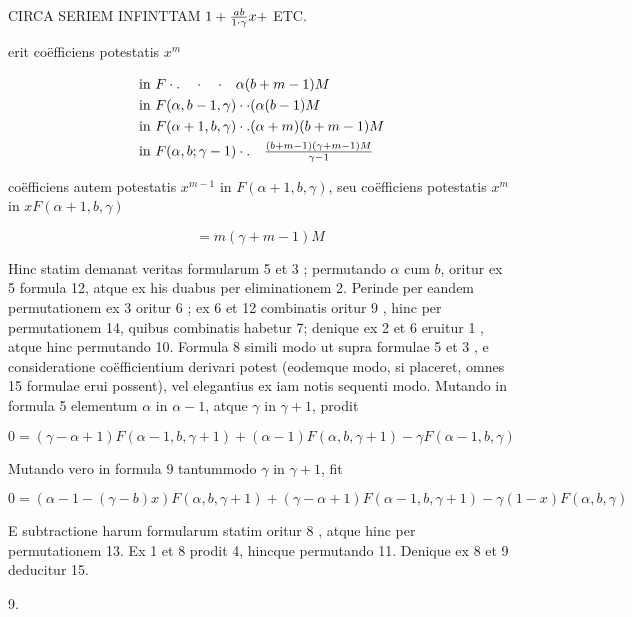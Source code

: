 \documentclass[twoside,12pt, showframe]{memoir}
\let\oldfrac\frac
\def\frac#1#2{\mathchoice{\tfrac{#1}{#2}}{\oldfrac{#1}{#2}}{\genfrac{}{}{}{2}{#1}{#2\mathstrut}}{\genfrac{}{}{}{3}{#1}{#2\mathstrut}}}
\begin{document}
CIRCA SERIEM INFINTTAM \(1+\frac{a b}{1 \cdot \gamma} x+\) ETC.

erit coëfficiens potestatis \(x^{m}\)

\[
\begin{aligned}
& \text { in } F \cdot . \quad \cdot \quad \cdot \quad \alpha(b+m-1) M \\
& \text { in } F(\alpha, b-1, \gamma) \cdot \cdot(\alpha(b-1) M \\
& \text { in } F(\alpha+1, b, \gamma) \cdot .(\alpha+m)(b+m-1) M \\
& \text { in } F(\alpha, b ; \gamma-1) \cdot . \quad \frac{(b+m-1)(\gamma+m-1) M}{\gamma-1}
\end{aligned}
\]

coëfficiens autem potestatis \(x^{m-1}\) in \(F(\alpha+1, b, \gamma)\), seu coëfficiens potestatis \(x^{m}\) in \(x F(\alpha+1, b, \gamma)\)

\[
=m(\gamma+m-1) M
\]

Hinc statim demanat veritas formularum 5 et 3 ; permutando \(\alpha\) cum \(b\), oritur ex 5 formula 12, atque ex his duabus per eliminationem 2. Perinde per eandem permutationem ex 3 oritur 6 ; ex 6 et 12 combinatis oritur 9 , hinc per permutationem 14, quibus combinatis habetur 7; denique ex 2 et 6 eruitur 1 , atque hinc permutando 10. Formula 8 simili modo ut supra formulae 5 et 3 , e consideratione coëfficientium derivari potest (eodemque modo, si placeret, omnes 15 formulae erui possent), vel elegantius ex iam notis sequenti modo. Mutando in formula 5 elementum \(\alpha\) in \(\alpha-1\), atque \(\gamma\) in \(\gamma+1\), prodit

\[
0=(\gamma-\alpha+1) F(\alpha-1, b, \gamma+1)+(\alpha-1) F(\alpha, b, \gamma+1)-\gamma F(\alpha-1, b, \gamma)
\]

Mutando vero in formula 9 tantummodo \(\gamma\) in \(\gamma+1\), fit

\(0=(\alpha-1-(\gamma-b) x) F(\alpha, b, \gamma+1)+(\gamma-\alpha+1) F(\alpha-1, b, \gamma+1)-\gamma(1-x) F(\alpha, b, \gamma)\)

E subtractione harum formularum statim oritur 8 , atque hinc per permutationem 13. Ex 1 et 8 prodit 4, hincque permutando 11. Denique ex 8 et 9 deducitur 15.

9.
\end{document}
